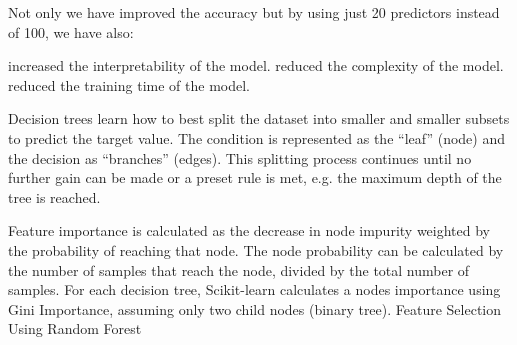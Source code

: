 \documentclass[preprint,12pt]{elsarticle}
\begin{document}
Not only we have improved the accuracy but by using just 20 predictors instead of 100, we have also:

    increased the interpretability of the model.
    reduced the complexity of the model.
    reduced the training time of the model.

Decision trees learn how to best split the dataset into smaller and smaller subsets to predict the target value. The condition is represented as the “leaf” (node) and the decision as “branches” (edges). This splitting process continues until no further gain can be made or a preset rule is met, e.g. the maximum depth of the tree is reached.


 
Feature importance is calculated as the decrease in node impurity weighted by the probability of reaching that node. The node probability can be calculated by the number of samples that reach the node, divided by the total number of samples. For each decision tree, Scikit-learn calculates a nodes importance using Gini Importance, assuming only two child nodes (binary tree).
Feature Selection Using Random Forest
\end{document}
